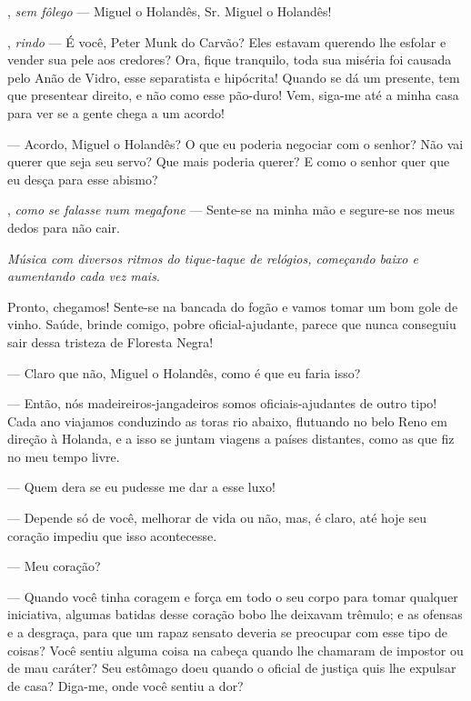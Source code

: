 \begin{myparindent}{0pt}
\begin{Parskip}
, \emph{sem fôlego} --- Miguel o Holandês, Sr. Miguel
o Holandês!

, \emph{rindo} --- É você, Peter Munk do Carvão? Eles
estavam querendo lhe esfolar e vender sua pele aos credores? Ora, fique
tranquilo, toda sua miséria foi causada pelo Anão de Vidro, esse
separatista e hipócrita! Quando se dá um presente, tem que presentear
direito, e não como esse pão-duro! Vem, siga-me até a minha casa para
ver se a gente chega a um acordo!

 --- Acordo, Miguel o Holandês? O que eu poderia
negociar com o senhor? Não vai querer que seja seu servo? Que mais
poderia querer? E como o senhor quer que eu desça para esse abismo?

, \emph{como se falasse num megafone} --- Sente-se na
minha mão e segure-se nos meus dedos para não cair.

\emph{Música com diversos ritmos do tique-taque de relógios, começando
baixo e aumentando cada vez mais}.

Pronto, chegamos! Sente-se na bancada do fogão e vamos tomar um bom gole
de vinho. Saúde, brinde comigo, pobre oficial-ajudante, parece que nunca
conseguiu sair dessa tristeza de Floresta Negra!

 --- Claro que não, Miguel o Holandês, como é que eu
faria isso?

 --- Então, nós madeireiros-jangadeiros somos
oficiais-ajudantes de outro tipo! Cada ano viajamos conduzindo as toras
rio abaixo, flutuando no belo Reno em direção à Holanda, e a isso se
juntam viagens a países distantes, como as que fiz no meu tempo livre.

 --- Quem dera se eu pudesse me dar a esse luxo!

 --- Depende só de você, melhorar de vida ou não, mas, é
claro, até hoje seu coração impediu que isso acontecesse.

 --- Meu coração?

 --- Quando você tinha coragem e força em todo o seu
corpo para tomar qualquer iniciativa, algumas batidas desse coração bobo
lhe deixavam trêmulo; e as ofensas e a desgraça, para que um rapaz
sensato deveria se preocupar com esse tipo de coisas? Você sentiu alguma
coisa na cabeça quando lhe chamaram de impostor ou de mau caráter? Seu
estômago doeu quando o oficial de justiça quis lhe expulsar de casa?
Diga-me, onde você sentiu a dor?


\end{Parskip}
\end{myparindent}
